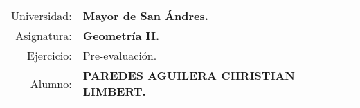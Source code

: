 \begin{tabular}{r l }
Universidad: & \textbf{Mayor de San Ándres.}\\
Asignatura: & \textbf{Geometría II.}\\
Ejercicio: & Pre-evaluación.\\ 
Alumno: & \textbf{PAREDES AGUILERA CHRISTIAN LIMBERT.}
\end{tabular}
\begin{flushleft}
\end{flushleft}
\vspace{.2cm}
